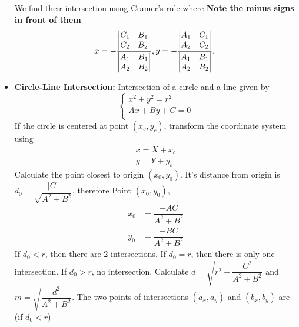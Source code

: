 \documentclass[12pt,a4paper,landscape]{amsart}
\begin{document}
\begin{multicols*}{3}
\begin{itemize}
\begin{equation*}
	\end{equation*}
	We find their intersection using Cramer's rule where \textbf{Note the minus signs in front of them}
	\begin{equation*}
		x = -\dfrac{\begin{vmatrix}
				C_1 & B_1\\
				C_2 & B_2\\
			\end{vmatrix}}{\begin{vmatrix}
				A_1 & B_1\\
				A_2 & B_2\\
			\end{vmatrix}},
		\\
		y = -\dfrac{\begin{vmatrix}
				A_1 & C_1\\
				A_2 & C_2\\
			\end{vmatrix}}{\begin{vmatrix}
				A_1 & B_1\\
				A_2 & B_2\\
			\end{vmatrix}},\\		
	\end{equation*}
	\item \textbf{Circle-Line Intersection:} Intersection of a circle and a line given by
		\begin{equation*}
			\begin{cases}
				x^2 + y^2 = r^2 \\
				Ax + By + C = 0 \\
			\end{cases}
		\end{equation*}
		If the circle is centered at point $(x_c, y_c)$, transform the coordinate system using
		\begin{gather*}
			x = X + x_c\\
			y = Y + y_c
		\end{gather*}
	Calculate the point closest to origin $(x_0, y_0)$. It's distance from origin is $d_0 = \dfrac{|C|}{\sqrt{A^2 + B^2}}$, therefore Point $(x_0, y_0)$,
		\begin{align*}
			x_0 &= \dfrac{-AC}{A^2 + B^2}\\
			y_0 &= \dfrac{-BC}{A^2 + B^2}
		\end{align*}
	If $d_0 < r$, then there are 2 intersections. If $d_0 = r$, then there is only one intersection. If $d_0 > r$, no intersection. Calculate $d = \sqrt{r^2 - \dfrac{C^2}{A^2 + B^2}}$ and $m = \sqrt{\dfrac{d^2}{A^2 + B^2}}$. The two points of intersections $(a_x, a_y)$ and $(b_x, b_y)$ are (if $d_0 < r$)

\end{itemize}
\end{multicols*}
\end{document}
